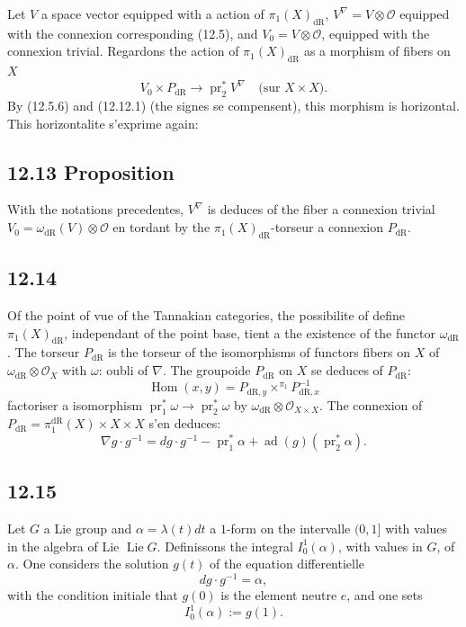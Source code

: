 \documentclass[12pt,a4paper]{article}
\theoremstyle{plain}
\theoremstyle{definition}
\theoremstyle{remark}
\DeclareMathOperator{\Lie}{Lie}
\DeclareMathOperator{\Hom}{Hom}
\DeclareMathOperator{\pr}{pr}
\DeclareMathOperator{\ad}{ad}
\newcommand{\cO}{\mathcal{O}}
\newcommand{\dr}{\mathrm{dR}}
\begin{document}
Let $V$ a space vector equipped with a action of $\pi_1(X)_{\dr}$, $V^\nabla = V \otimes \cO$ equipped with the connexion corresponding (12.5), and $V_0 = V \otimes \cO$, equipped with the connexion trivial. Regardons the action of $\pi_1(X)_{\dr}$ as a morphism of fibers on $X$
\begin{equation}\label{eq:12.12.2}
V_0 \times P_{\dr} \to \pr_2^* V^\nabla \quad \text{(sur } X \times X \text{)}.
\end{equation}
By (12.5.6) and (12.12.1) (the signes se compensent), this morphism is horizontal. This horizontalite s'exprime again:

\subsection*{12.13 Proposition}

With the notations precedentes, $V^\nabla$ is deduces of the fiber a connexion trivial $V_0 = \omega_{\dr}(V) \otimes \cO$ en tordant by the $\pi_1(X)_{\dr}$-torseur a connexion $P_{\dr}$.

\subsection*{12.14}

Of the point of vue of the Tannakian categories, the possibilite of define $\pi_1(X)_{\dr}$, independant of the point base, tient a the existence of the functor $\omega_{\dr}$. The torseur $P_{\dr}$ is the torseur of the isomorphisms of functors fibers on $X$ of $\omega_{\dr} \otimes \cO_X$ with $\omega$: oubli of $\nabla$. The groupoide $P_{\dr}$ on $X$ se deduces of $P_{\dr}$:
\begin{equation}\label{eq:12.14.1}
\Hom(x,y) = P_{\dr,y} \times^{\pi_1} P_{\dr,x}^{-1}
\end{equation}
factoriser a isomorphism $\pr_1^* \omega \to \pr_2^* \omega$ by $\omega_{\dr} \otimes \cO_{X \times X}$. The connexion of $P_{\dr} = \pi_1^{\dr}(X) \times X \times X$ s'en deduces:
\begin{equation}\label{eq:12.14.2}
\nabla g \cdot g^{-1} = dg \cdot g^{-1} - \pr_1^* \alpha + \ad(g)(\pr_2^* \alpha).
\end{equation}

\subsection*{12.15}

Let $G$ a Lie group and $\alpha = \lambda(t)dt$ a $1$-form on the intervalle $(0,1]$ with values in the algebra of Lie $\Lie G$. Definissons the integral $I_0^1(\alpha)$, with values in $G$, of $\alpha$. One considers the solution $g(t)$ of the equation differentielle
\[
dg \cdot g^{-1} = \alpha,
\]
with the condition initiale that $g(0)$ is the element neutre $e$, and one sets
\[
I_0^1(\alpha) := g(1).
\]
\end{document}
